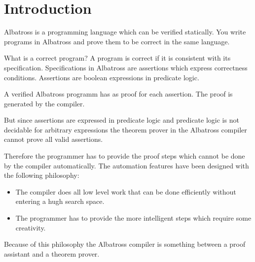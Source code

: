 \chapter{Introduction}


Albatross is a programming language which can be verified statically. You
write programs in Albatross and prove them to be correct in the same language.

What is a correct program? A program is correct if it is consistent with its
specification. Specifications in Albatross are assertions which express
correctness conditions. Assertions are boolean expressions in predicate logic.


A verified Albatross programm has as proof for each assertion. The proof is
generated by the compiler.

But since assertions are expressed in predicate logic and predicate logic is
not decidable for arbitrary expressions the theorem prover in the Albatross
compiler cannot prove all valid assertions.

Therefore the programmer has to provide the proof steps which cannot be done
by the compiler automatically. The automation features have been designed with
the following philosophy:

\begin{itemize}
\item The compiler does all low level work that can be done efficiently
  without entering a hugh search space.

\item The programmer has to provide the more intelligent steps which require
  some creativity.

\end{itemize}

Because of this philosophy the Albatross compiler is something between a proof
assistant and a theorem prover.







